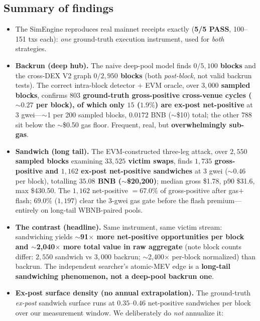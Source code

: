 \documentclass[11pt]{article}
\begin{document}
\subsection{Summary of findings}
\begin{itemize}
  \item The SimEngine reproduces real mainnet receipts exactly (\textbf{5/5 PASS},
    100--151 txs each): \emph{one} ground-truth execution instrument, used for
    \emph{both} strategies.
  \item \textbf{Backrun (deep hub).} The naive deep-pool model finds
    \textbf{$0/5{,}100$ blocks} and the cross-DEX V2 graph \textbf{$0/2{,}950$
    blocks} (both \emph{post-block}, not valid backrun tests). The correct
    intra-block detector $+$ EVM oracle, over \textbf{$3{,}000$ sampled blocks},
    confirms \textbf{$803$ ground-truth gross-positive cross-venue cycles
    ($\sim$$0.27$ per block), of which only $15$ ($1.9\%$) are ex-post net-positive}
    at 3 gwei---$\sim$1 per 200 sampled blocks, $0.0172$ BNB ($\sim$\$10) total; the
    other $788$ sit below the $\sim$\$0.50 gas floor. Frequent, real, but
    \textbf{overwhelmingly sub-gas}.
  \item \textbf{Sandwich (long tail).} The EVM-constructed three-leg attack, over
    \textbf{$2{,}550$ sampled blocks} examining \textbf{$33{,}525$ victim swaps},
    finds \textbf{$1{,}735$ gross-positive and $1{,}162$ ex-post net-positive
    sandwiches} at 3 gwei ($\sim$$0.46$ per block), totalling \textbf{$35.08$ BNB
    ($\sim$\$20{,}200)}; median gross \$1.78, p90 \$31.6, max \$430.50. The $1{,}162$
    net-positive $=67.0\%$ of gross-positive after gas$+$flash; $69.0\%$ ($1{,}197$)
    clear the 3-gwei gas gate before the flash premium---entirely on long-tail
    WBNB-paired pools.
  \item \textbf{The contrast (headline).} Same instrument, same victim stream:
    sandwiching yields \textbf{$\sim$91$\times$ more net-positive opportunities per
    block and $\sim$2{,}040$\times$ more total value in raw aggregate} (note block
    counts differ: $2{,}550$ sandwich vs $3{,}000$ backrun; $\sim$2{,}400$\times$
    per-block normalized) than backrun. The independent
    searcher's atomic-MEV edge is a \textbf{long-tail sandwiching phenomenon, not a
    deep-pool backrun one}.
  \item \textbf{Ex-post surface density (no annual extrapolation).} The ground-truth
    \emph{ex-post} sandwich surface runs at $0.35$--$0.46$ net-positive sandwiches per
    block over our measurement window. We deliberately do \emph{not} annualize it:
$$
\end{itemize}
\end{document}
